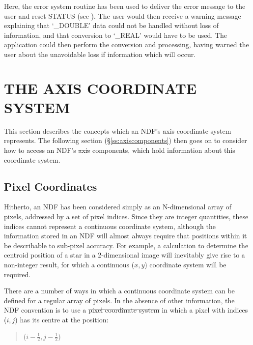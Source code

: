 Here, the error system routine 
has been used to deliver the error message to the user and reset
STATUS (see ).
The user would then receive a warning message explaining that `\_DOUBLE'
data could not be handled without loss of information, and that conversion
to `\_REAL' would have to be used. 
The application could then perform the conversion and processing, having
warned the user about the unavoidable loss if information which will occur. 


\section{\label{ss:axiscoordinates}THE AXIS COORDINATE SYSTEM}

This section describes the concepts which an NDF's \st{axis\/} coordinate
system represents.
The following section (\S\ref{ss:axiscomponents}) then goes on to consider
how to access an NDF's \st{axis\/} components, which hold information about
this coordinate system. 

\subsection{\label{ss:pixelcoordinates}Pixel Coordinates}

Hitherto, an NDF has been considered simply as an N-dimensional array of
pixels, addressed by a set of pixel indices.
Since they are integer quantities, these indices cannot represent a
continuous coordinate system, although the information stored in an NDF will
almost always require that positions within it be describable to sub-pixel
accuracy. 
For example, a calculation to determine the centroid position of a star in a
2-dimensional image will inevitably give rise to a non-integer result, for
which a continuous ($x,y$) coordinate system will be required. 

There are a number of ways in which a continuous coordinate system can be
defined for a regular array of pixels. 
In the absence of other information, the NDF convention is to use a
\st{pixel coordinate system\/} in which a pixel with indices ($i,j$)
has 
its centre at the position:

\small
\begin{quote}
\begin{center}
($i-\frac{1}{2},j-\frac{1}{2}$)
\end{center}
\end{quote}
\normalsize


